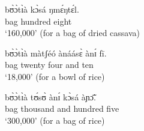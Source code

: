 \begin{exe}
\begin{exe}
\begin{exe}
{\begin{exe}
\begin{exe}
\begin{exe}
\begin{exe}
\begin{exe}
\begin{exe}
\begin{exe}
\begin{exe}
\begin{exe}
\ex\label{ex:cassavabag}
\gll bʊ̀ɔ̀tɪ̀à kɔ̀sá ŋmɛ́ŋtɛ́l.\\
bag hundred eight\\
\glt `160,000' (for a bag of dried cassava) 


\ex\label{ex:ricebowl}
\gll bʊ̀ɔ̀tɪ̀à màtʃéó   ànáásɛ̀ ànɪ́ fī.\\
bag twenty four and ten\\
\glt `18,000' (for a bowl of rice) 

\ex\label{ex:Ricebag}
\gll bʊ̀ɔ̀tɪ̀à tʊ́sʊ̀ ànɪ́ kɔ̀sá  àɲɔ̃̄.\\
bag thousand and hundred five\\
\glt `300,000' (for a bag of rice) 


\z
\z



\end{exe}
\end{exe}
\end{exe}
\end{exe}
\end{exe}
\end{exe}
\end{exe}
\end{exe}
\end{exe}}
\end{exe}
\end{exe}
\end{exe}
